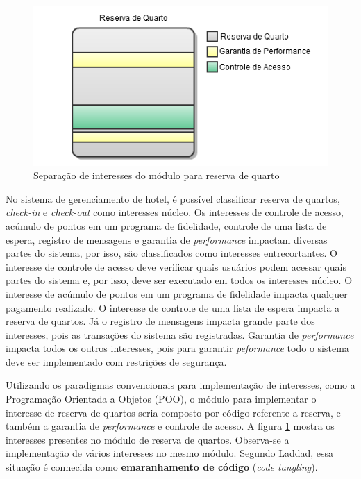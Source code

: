 \begin{figure}[!hb]
	\centering
	\includegraphics{img/context_aspect_concerns.png}
	\caption{Separação de interesses do módulo para reserva de quarto}\label{fig:context_aspect_concerns}
\end{figure}

No sistema de gerenciamento de hotel, é possível classificar reserva de quartos, \textit{check-in} e \textit{check-out} como interesses núcleo.
Os interesses de controle de acesso, acúmulo de pontos em um programa de fidelidade, controle de uma lista de espera, registro de mensagens e garantia
de \textit{performance} impactam diversas partes do sistema, por isso, são classificados como interesses entrecortantes. O interesse de controle de acesso deve 
verificar quais usuários podem acessar quais partes do sistema e, por isso, deve ser executado em todos os interesses núcleo. O interesse de
acúmulo de pontos em um programa de fidelidade impacta qualquer pagamento realizado. O interesse de controle de uma lista de espera impacta a
reserva de quartos. Já o registro de mensagens impacta grande parte dos interesses, pois as transações do sistema são registradas. Garantia de
\textit{performance} impacta todos os outros interesses, pois para garantir \textit{peformance} todo o sistema deve ser implementado com restrições
de segurança.

Utilizando os paradigmas convencionais para implementação de interesses, como a Programação Orientada a Objetos (POO), o módulo
para implementar o interesse de reserva de quartos seria composto  por código referente a reserva, e também a garantia de \textit{performance} e 
controle de acesso. A figura \ref{fig:context_aspect_concerns} mostra os interesses presentes no módulo de reserva de quartos. Observa-se a
implementação de vários interesses no mesmo módulo. Segundo Laddad\cite{Laddad:2003:AAP:993468}, essa situação é conhecida como \textbf{emaranhamento
de código} (\textit{code tangling}).

